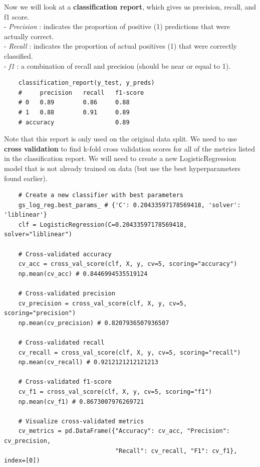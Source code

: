 \documentclass[11pt, a4paper]{article}
\begin{document}
\begin{spacing}{1.1}
	\noindent Now we will look at a \textbf{classification report}, which gives us precision, recall, and f1 score. \\
	\hspace*{3mm} - \textit{Precision} : indicates the proportion of positive (1) predictions that were actually correct. \\
	\hspace*{3mm} - \textit{Recall} : indicates the proportion of actual positives (1) that were correctly classified. \\
	\hspace*{3mm} - \textit{f1} : a combination of recall and precision (should be near or equal to 1).
	\begin{lstlisting}
	classification_report(y_test, y_preds)
	#     precision   recall   f1-score
	# 0   0.89        0.86     0.88
	# 1   0.88        0.91     0.89
	# accuracy                 0.89 \end{lstlisting} \vspace*{1mm}
	Note that this report is only used on the original data split. We need to use \textbf{cross validation} to find k-fold cross validation scores for all of the metrics listed in the classification report. We will need to create a new LogisticRegression model that is not already trained on data (but use the best hyperparameters found earlier). 
	\begin{lstlisting}
	# Create a new classifier with best parameters
	gs_log_reg.best_params_ # {'C': 0.20433597178569418, 'solver': 'liblinear'}
	clf = LogisticRegression(C=0.20433597178569418,	solver="liblinear")
	
	# Cross-validated accuracy
	cv_acc = cross_val_score(clf, X, y, cv=5, scoring="accuracy")
	np.mean(cv_acc) # 0.8446994535519124
	
	# Cross-validated precision
	cv_precision = cross_val_score(clf, X, y, cv=5, scoring="precision")
	np.mean(cv_precision) # 0.8207936507936507
	
	# Cross-validated recall
	cv_recall = cross_val_score(clf, X, y, cv=5, scoring="recall")
	np.mean(cv_recall) # 0.9212121212121213
	
	# Cross-validated f1-score
	cv_f1 = cross_val_score(clf, X, y, cv=5, scoring="f1")
	np.mean(cv_f1) # 0.8673007976269721
	
	# Visualize cross-validated metrics
	cv_metrics = pd.DataFrame({"Accuracy": cv_acc, "Precision": cv_precision,
	                           "Recall": cv_recall, "F1": cv_f1}, index=[0])
	

\end{lstlisting}
\end{spacing}
\end{document}
